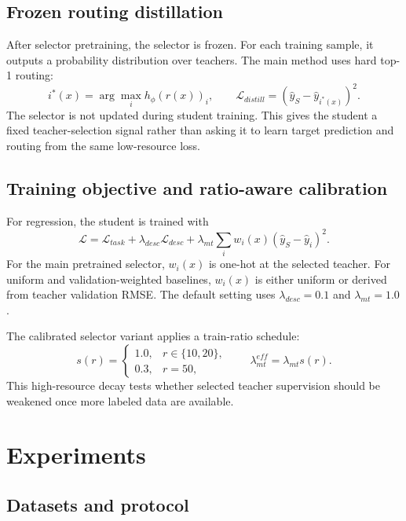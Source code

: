 \documentclass[11pt]{article}
\begin{document}
\subsection{Frozen routing distillation}

After selector pretraining, the selector is frozen. For each training sample,
it outputs a probability distribution over teachers. The main method uses hard
top-1 routing:
\[
i^*(x)=\arg\max_i h_\phi(r(x))_i,\qquad
\mathcal{L}_{distill}=(\hat{y}_S-\hat{y}_{i^*(x)})^2.
\]
The selector is not updated during student training. This gives the student a
fixed teacher-selection signal rather than asking it to learn target
prediction and routing from the same low-resource loss.

\subsection{Training objective and ratio-aware calibration}

For regression, the student is trained with
\[
\mathcal{L}=\mathcal{L}_{task}
+\lambda_{desc}\mathcal{L}_{desc}
+\lambda_{mt}\sum_i w_i(x)(\hat{y}_S-\hat{y}_i)^2.
\]
For the main pretrained selector, \(w_i(x)\) is one-hot at the selected
teacher. For uniform and validation-weighted baselines, \(w_i(x)\) is either
uniform or derived from teacher validation RMSE. The default setting uses
\(\lambda_{desc}=0.1\) and \(\lambda_{mt}=1.0\).

The calibrated selector variant applies a train-ratio schedule:
\[
s(r)=
\begin{cases}
1.0, & r\in\{10,20\},\\
0.3, & r=50,
\end{cases}
\qquad
\lambda_{mt}^{eff}=\lambda_{mt}s(r).
\]
This high-resource decay tests whether selected teacher supervision should be
weakened once more labeled data are available.

\section{Experiments}

\subsection{Datasets and protocol}
\end{document}
